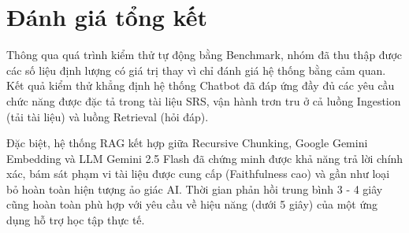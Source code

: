 \section{Đánh giá tổng kết}

Thông qua quá trình kiểm thử tự động bằng Benchmark, nhóm đã thu thập được các số liệu định lượng có giá trị thay vì chỉ đánh giá hệ thống bằng cảm quan. Kết quả kiểm thử khẳng định hệ thống Chatbot đã đáp ứng đầy đủ các yêu cầu chức năng được đặc tả trong tài liệu SRS, vận hành trơn tru ở cả luồng Ingestion (tải tài liệu) và luồng Retrieval (hỏi đáp).

Đặc biệt, hệ thống RAG kết hợp giữa Recursive Chunking, Google Gemini Embedding và LLM Gemini 2.5 Flash đã chứng minh được khả năng trả lời chính xác, bám sát phạm vi tài liệu được cung cấp (Faithfulness cao) và gần như loại bỏ hoàn toàn hiện tượng ảo giác AI. Thời gian phản hồi trung bình 3 - 4 giây cũng hoàn toàn phù hợp với yêu cầu về hiệu năng (dưới 5 giây) của một ứng dụng hỗ trợ học tập thực tế.